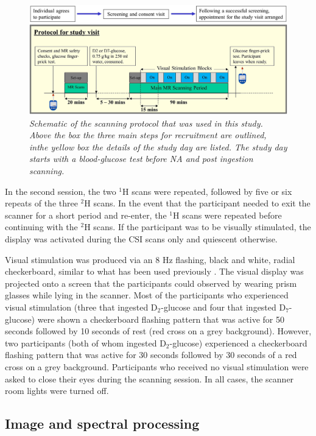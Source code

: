 \begin{figure}
    \centering
    \includegraphics[width = 1\textwidth]{Figures/Glucose/Protocol.png}
    \caption{\textit{Schematic of the scanning protocol that was used in this study. Above the box the three main steps for recruitment are outlined, inthe yellow box the details of the study day are listed. The study day starts with a blood-glucose test before \ac{NA} and post ingestion scanning.}}
    \label{fig:Glu:Protocol}
\end{figure}

In the second session, the two $^1$H scans were repeated, followed by five or six repeats of the three $^2$H scans. In the event that the participant needed to exit the scanner for a short period and re-enter, the $^1$H scans were repeated before continuing with the $^2$H scans. If the participant was to be visually stimulated, the display was activated during the \ac{CSI} scans only and quiescent otherwise.  

Visual stimulation was produced via an 8 Hz flashing, black and white, radial checkerboard, similar to what has been used previously \cite{Fernandes2020MeasurementT}. The visual display was projected onto a screen that the participants could observed by wearing prism glasses while lying in the scanner. Most of the participants who experienced visual stimulation (three that ingested D$_2$-glucose and four that ingested D$_7$-glucose) were shown a checkerboard flashing pattern that was active for 50 seconds followed by 10 seconds of rest (red cross on a grey background). However, two participants (both of whom ingested D$_2$-glucose) experienced a checkerboard flashing pattern that was active for 30 seconds followed by 30 seconds of a red cross on a grey background. Participants who received no visual stimulation were asked to close their eyes during the scanning session. In all cases, the scanner room lights were turned off. 

\subsection{Image and spectral processing}

